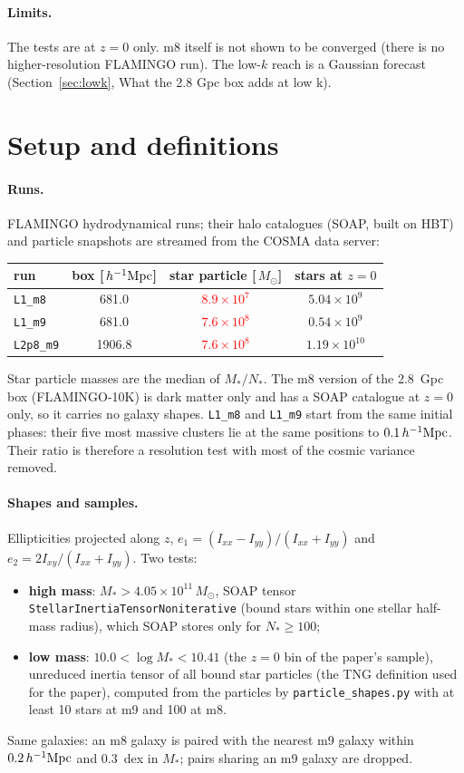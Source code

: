 \documentclass[11pt]{article}
\newcommand{\Mpch}{\,h^{-1}{\rm Mpc}}
\newcommand{\Msun}{\,M_\odot}
\newcommand{\Mstar}{M_\ast}
\newcommand{\Nstar}{N_\ast}
\newcommand{\run}[1]{\texttt{#1}}
\newif\ifnumbersfinal
\newcommand{\refresh}[1]{\ifnumbersfinal#1\else\textcolor{red}{#1}\fi}
\newcommand{\mStarMnine}{\refresh{\ensuremath{7.6\times10^{8}}}}
\newcommand{\mStarMeight}{\refresh{\ensuremath{8.9\times10^{7}}}}
\newcommand{\LoneBox}{681.0}
\newcommand{\LtwoBox}{1906.8}
\newcommand{\NstarsLeight}{\ensuremath{5.04\times10^{9}}}
\newcommand{\NstarsLnine}{\ensuremath{0.54\times10^{9}}}
\newcommand{\NstarsLtwo}{\ensuremath{1.19\times10^{10}}}
\begin{document}
\paragraph{Limits.}
The tests are at $z = 0$ only. m8 itself is not shown to be converged (there is
no higher-resolution FLAMINGO run). The low-$k$ reach is a Gaussian forecast
(Section~\ref{sec:lowk}, What the 2.8 Gpc box adds at low k).

\section{Setup and definitions}
\label{sec:setup}

\paragraph{Runs.}
FLAMINGO hydrodynamical runs; their halo catalogues (SOAP, built on HBT) and
particle snapshots are streamed from the COSMA data server:
\begin{center}
  \begin{tabular}{lccc}
    \toprule
    run & box [$\Mpch$] & star particle [$\Msun$] & stars at $z=0$ \\
    \midrule
    \run{L1\_m8}   & \LoneBox & \mStarMeight & \NstarsLeight \\
    \run{L1\_m9}   & \LoneBox & \mStarMnine  & \NstarsLnine \\
    \run{L2p8\_m9} & \LtwoBox & \mStarMnine  & \NstarsLtwo \\
    \bottomrule
  \end{tabular}
\end{center}
Star particle masses are the median of $\Mstar/\Nstar$. The m8 version of the
2.8~Gpc box (FLAMINGO-10K) is dark matter only and has a SOAP catalogue at $z=0$
only, so it carries no galaxy shapes. \run{L1\_m8} and \run{L1\_m9} start from
the same initial phases: their five most massive clusters lie at the same
positions to $0.1\Mpch$. Their ratio is therefore a resolution test with most of
the cosmic variance removed.

\paragraph{Shapes and samples.}
Ellipticities projected along $z$, $e_1 = (I_{xx}-I_{yy})/(I_{xx}+I_{yy})$ and
$e_2 = 2I_{xy}/(I_{xx}+I_{yy})$. Two tests:
\begin{itemize}
  \item \textbf{high mass}: $\Mstar > 4.05\times10^{11}\Msun$, SOAP tensor
    \texttt{StellarInertiaTensorNoniterative} (bound stars within one stellar
    half-mass radius), which SOAP stores only for $\Nstar \ge 100$;
  \item \textbf{low mass}: $10.0 < \log\Mstar < 10.41$ (the $z=0$ bin of the
    paper's sample), unreduced inertia tensor of all bound star particles
    (the TNG definition used for the paper), computed from the particles by
    \texttt{particle\_shapes.py} with at least 10 stars at m9 and 100 at m8.
\end{itemize}
Same galaxies: an m8 galaxy is paired with the nearest m9 galaxy within
$0.2\Mpch$ and 0.3~dex in $\Mstar$; pairs sharing an m9 galaxy are dropped.
\end{document}
